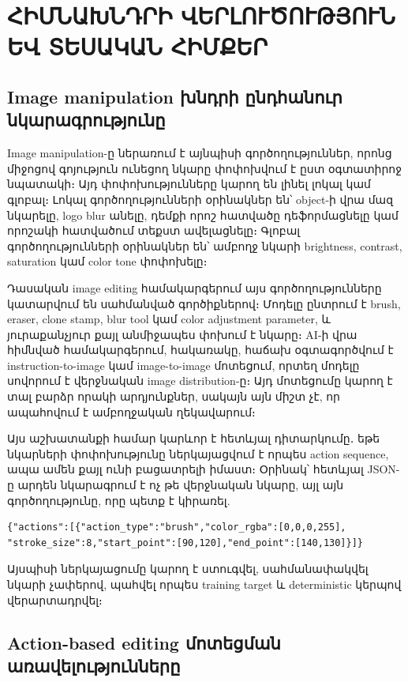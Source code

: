 \documentclass[12pt,a4paper]{report}
\newcommand{\Eng}[1]{\textenglish{#1}}
\begin{document}
\chapter{ՀԻՄՆԱԽՆԴՐԻ ՎԵՐԼՈՒԾՈՒԹՅՈՒՆ ԵՎ ՏԵՍԱԿԱՆ ՀԻՄՔԵՐ}

\section{Image manipulation խնդրի ընդհանուր նկարագրությունը}

Image manipulation-ը ներառում է այնպիսի գործողություններ, որոնց միջոցով գոյություն ունեցող նկարը փոփոխվում է ըստ օգտատիրոջ նպատակի։ Այդ փոփոխությունները կարող են լինել լոկալ կամ գլոբալ։ Լոկալ գործողությունների օրինակներ են՝ object-ի վրա մազ նկարելը, logo blur անելը, դեմքի որոշ հատվածը դեֆորմացնելը կամ որոշակի հատվածում տեքստ ավելացնելը։ Գլոբալ գործողությունների օրինակներ են՝ ամբողջ նկարի brightness, contrast, saturation կամ color tone փոփոխելը։

Դասական image editing համակարգերում այս գործողությունները կատարվում են սահմանված գործիքներով։ Մոդելը ընտրում է brush, eraser, clone stamp, blur tool կամ color adjustment parameter, և յուրաքանչյուր քայլ անմիջապես փոխում է նկարը։ \Eng{AI}-ի վրա հիմնված համակարգերում, հակառակը, հաճախ օգտագործվում է instruction-to-image կամ image-to-image մոտեցում, որտեղ մոդելը սովորում է վերջնական image distribution-ը։ Այդ մոտեցումը կարող է տալ բարձր որակի արդյունքներ, սակայն այն միշտ չէ, որ ապահովում է ամբողջական ղեկավարում։

Այս աշխատանքի համար կարևոր է հետևյալ դիտարկումը․ եթե նկարների փոփոխությունը ներկայացվում է որպես action sequence, ապա ամեն քայլ ունի բացատրելի իմաստ։ Օրինակ՝ հետևյալ JSON-ը արդեն նկարագրում է ոչ թե վերջնական նկարը, այլ այն գործողությունը, որը պետք է կիրառել.

\begin{lstlisting}[style=code]
{"actions":[{"action_type":"brush","color_rgba":[0,0,0,255],
"stroke_size":8,"start_point":[90,120],"end_point":[140,130]}]}
\end{lstlisting}

Այսպիսի ներկայացումը կարող է ստուգվել, սահմանափակվել նկարի չափերով, պահվել որպես training target և deterministic կերպով վերարտադրվել։

\section{Action-based editing մոտեցման առավելությունները}
\end{document}
